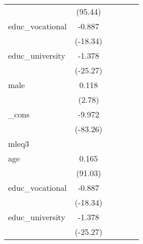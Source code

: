 {\begin{tabular}{l*{5}{c}}
            &     (95.44)         &                     &                     &                     &                     \\
[1em]
educ\_vocational&      -0.887\sym{***}&                     &                     &                     &                     \\
            &    (-18.34)         &                     &                     &                     &                     \\
[1em]
educ\_university&      -1.378\sym{***}&                     &                     &                     &                     \\
            &    (-25.27)         &                     &                     &                     &                     \\
[1em]
male        &       0.118\sym{**} &                     &                     &                     &                     \\
            &      (2.78)         &                     &                     &                     &                     \\
[1em]
\_cons      &      -9.972\sym{***}&                     &                     &                     &                     \\
            &    (-83.26)         &                     &                     &                     &                     \\
\hline
mleq3       &                     &                     &                     &                     &                     \\
age         &       0.165\sym{***}&                     &                     &                     &                     \\
            &     (91.03)         &                     &                     &                     &                     \\
[1em]
educ\_vocational&      -0.887\sym{***}&                     &                     &                     &                     \\
            &    (-18.34)         &                     &                     &                     &                     \\
[1em]
educ\_university&      -1.378\sym{***}&                     &                     &                     &                     \\
            &    (-25.27)         &                     &                     &                     &                     \\

\end{tabular}}
